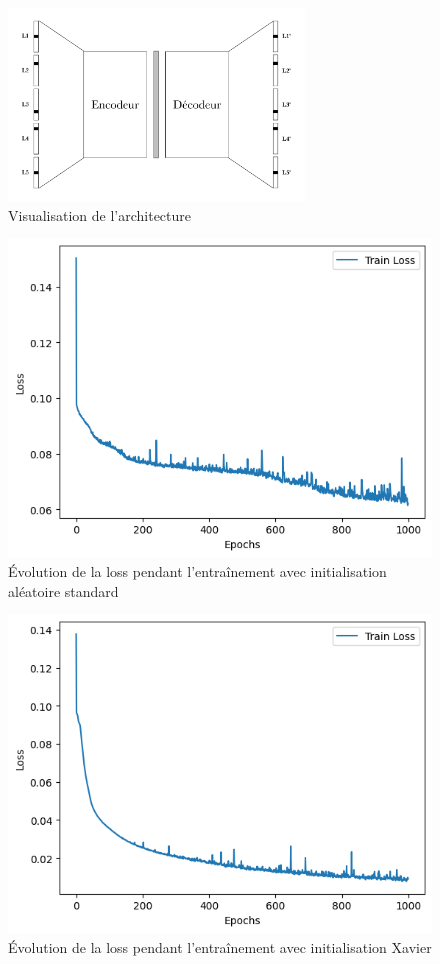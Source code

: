 \documentclass{article}
\begin{document}
\begin{figure}[H]
    \centering
    \includegraphics[width=0.7\textwidth]{Images/encodeur-decodeur.pdf}
    \caption{Visualisation de l'architecture}
    \label{fig:mirror_example}
\end{figure}

\begin{figure}[H]
    \centering
    \includegraphics[width=0.6\linewidth]{Images/loss_no_init.png}
    \caption{Évolution de la loss pendant l’entraînement avec initialisation aléatoire standard}
    \label{fig:loss_no_init}
\end{figure}

\begin{figure}[H]
    \centering
    \includegraphics[width=0.6\linewidth]{Images/loss_xavier_init.png}
    \caption{Évolution de la loss pendant l’entraînement avec initialisation Xavier}
    \label{fig:loss_xavier_init}
\end{figure}
\end{document}
